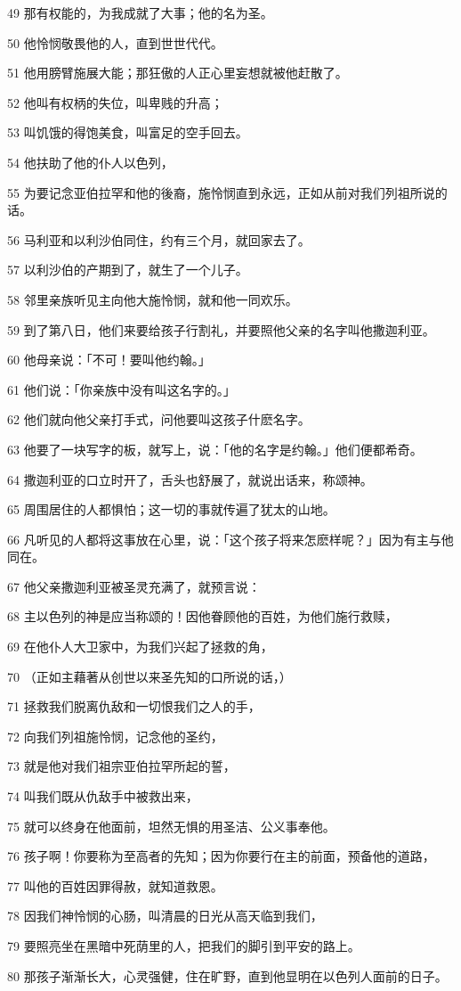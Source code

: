 \par 49 那有权能的，为我成就了大事；他的名为圣。
\par 50 他怜悯敬畏他的人，直到世世代代。
\par 51 他用膀臂施展大能；那狂傲的人正心里妄想就被他赶散了。
\par 52 他叫有权柄的失位，叫卑贱的升高；
\par 53 叫饥饿的得饱美食，叫富足的空手回去。
\par 54 他扶助了他的仆人以色列，
\par 55 为要记念亚伯拉罕和他的後裔，施怜悯直到永远，正如从前对我们列祖所说的话。
\par 56 马利亚和以利沙伯同住，约有三个月，就回家去了。
\par 57 以利沙伯的产期到了，就生了一个儿子。
\par 58 邻里亲族听见主向他大施怜悯，就和他一同欢乐。
\par 59 到了第八日，他们来要给孩子行割礼，并要照他父亲的名字叫他撒迦利亚。
\par 60 他母亲说：「不可！要叫他约翰。」
\par 61 他们说：「你亲族中没有叫这名字的。」
\par 62 他们就向他父亲打手式，问他要叫这孩子什麽名字。
\par 63 他要了一块写字的板，就写上，说：「他的名字是约翰。」他们便都希奇。
\par 64 撒迦利亚的口立时开了，舌头也舒展了，就说出话来，称颂神。
\par 65 周围居住的人都惧怕；这一切的事就传遍了犹太的山地。
\par 66 凡听见的人都将这事放在心里，说：「这个孩子将来怎麽样呢？」因为有主与他同在。
\par 67 他父亲撒迦利亚被圣灵充满了，就预言说：
\par 68 主以色列的神是应当称颂的！因他眷顾他的百姓，为他们施行救赎，
\par 69 在他仆人大卫家中，为我们兴起了拯救的角，
\par 70 （正如主藉著从创世以来圣先知的口所说的话，）
\par 71 拯救我们脱离仇敌和一切恨我们之人的手，
\par 72 向我们列祖施怜悯，记念他的圣约，
\par 73 就是他对我们祖宗亚伯拉罕所起的誓，
\par 74 叫我们既从仇敌手中被救出来，
\par 75 就可以终身在他面前，坦然无惧的用圣洁、公义事奉他。
\par 76 孩子啊！你要称为至高者的先知；因为你要行在主的前面，预备他的道路，
\par 77 叫他的百姓因罪得赦，就知道救恩。
\par 78 因我们神怜悯的心肠，叫清晨的日光从高天临到我们，
\par 79 要照亮坐在黑暗中死荫里的人，把我们的脚引到平安的路上。
\par 80 那孩子渐渐长大，心灵强健，住在旷野，直到他显明在以色列人面前的日子。

